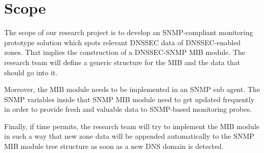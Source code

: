 \section{Scope}
\label{chap:Scope}
The scope of our research project is to develop an SNMP-compliant monitoring prototype solution which spots relevant DNSSEC data of DNSSEC-enabled zones.
That implies the construction of a DNSSEC-SNMP MIB module. The research team  will define a generic structure for the MIB and the data that should go into it.

Moreover, the MIB module needs to be implemented in an SNMP sub agent. The SNMP variables inside that SNMP MIB module need to get updated frequently in order to provide fresh and valuable data to SNMP-based monitoring probes.

Finally, if time permits, the research team will try to implement the MIB module in such a way that new zone data will be appended automatically to the SNMP MIB module tree structure as soon as a new DNS domain is detected.


